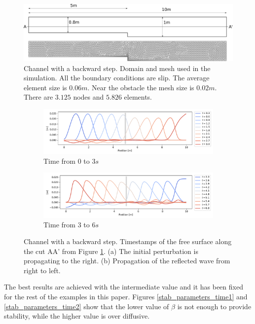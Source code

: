 \begin{figure}
    \includegraphics[width=\textwidth]{img/eulerian/step/geometry.pdf}
    \caption{Channel with a backward step. Domain and mesh used in the simulation. All the boundary conditions are slip. The average element size is $0.06m$. Near the obstacle the mesh size is $0.02m$. There are $3.125$ nodes and $5.826$ elements.}
    \label{step_mesh}
\end{figure}

\begin{figure}[H]
\begin{subfigure}{\textwidth}
    \centering
    \includegraphics[width=\textwidth]{img/eulerian/step/free_surface_1.pdf}
    \caption{Time from $0$ to $3s$}
\end{subfigure}
\begin{subfigure}{\textwidth}
    \centering
    \includegraphics[width=\textwidth]{img/eulerian/step/free_surface_2.pdf}
    \caption{Time from $3$ to $6s$}
\end{subfigure}
\caption{Channel with a backward step. Timestamps of the free surface along the cut AA' from Figure \ref{step_mesh}. (a) The initial perturbation is propagating to the right. (b) Propagation of the reflected wave from right to left.}
\label{waves_propagation}
\end{figure}


The best results are achieved with the intermediate value and it has been fixed for the rest of the examples in this paper.
Figures \ref{stab_parameters_time1} and \ref{stab_parameters_time2} show that the lower value of $\beta$ is not enough to provide stability, while the higher value is over diffusive.

